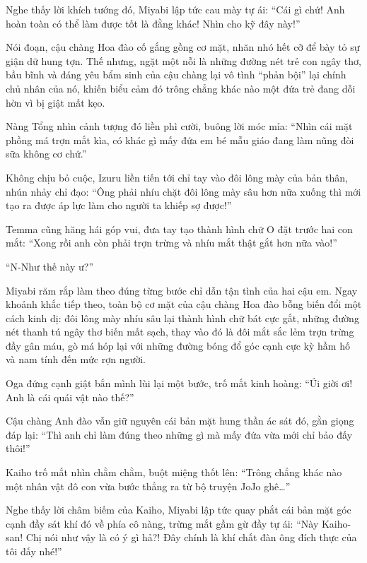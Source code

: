 \documentclass[../main.tex]{subfiles}
\begin{document}
Nghe thấy lời khích tướng đó, Miyabi lập tức cau mày tự ái: ``Cái gì chứ! Anh hoàn toàn có thể làm được tốt là đằng khác! Nhìn cho kỹ đây này!''

Nói đoạn, cậu chàng Hoa đào cố gắng gồng cơ mặt, nhăn nhó hết cỡ để bày tỏ sự giận dữ hung tợn. Thế nhưng, ngặt một nỗi là những đường nét trẻ con ngây thơ, bầu bĩnh và đáng yêu bẩm sinh của cậu chàng lại vô tình ``phản bội'' lại chính chủ nhân của nó, khiến biểu cảm đó trông chẳng khác nào một đứa trẻ đang dỗi hờn vì bị giật mất kẹo.


Nàng Tổng nhìn cảnh tượng đó liền phì cười, buông lời móc mỉa: ``Nhìn cái mặt phồng má trợn mắt kìa, có khác gì mấy đứa em bé mẫu giáo đang làm nũng đòi sữa không cơ chứ.''

Không chịu bỏ cuộc, Izuru liền tiến tới chỉ tay vào đôi lông mày của bản thân, nhún nhảy chỉ đạo: ``Ông phải nhíu chặt đôi lông mày sâu hơn nữa xuống thì mới tạo ra được áp lực làm cho người ta khiếp sợ được!''

Temma cũng hăng hái góp vui, đưa tay tạo thành hình chữ O đặt trước hai con mắt: ``Xong rồi anh còn phải trợn trừng và nhíu mắt thật gắt hơn nữa vào!''

``N-Như thế này ư?''

Miyabi răm rắp làm theo đúng từng bước chỉ dẫn tận tình của hai cậu em. Ngay khoảnh khắc tiếp theo, toàn bộ cơ mặt của cậu chàng Hoa đào bỗng biến đổi một cách kinh dị: đôi lông mày nhíu sâu lại thành hình chữ bát cực gắt, những đường nét thanh tú ngây thơ biến mất sạch, thay vào đó là đôi mắt sắc lẻm trợn trừng đầy gân máu, gò má hóp lại với những đường bóng đổ góc cạnh cực kỳ hầm hố và nam tính đến mức rợn người.


Oga đứng cạnh giật bắn mình lùi lại một bước, trố mắt kinh hoàng: ``Úi giời ơi! Anh là cái quái vật nào thế?''

Cậu chàng Anh đào vẫn giữ nguyên cái bản mặt hung thần ác sát đó, gằn giọng đáp lại: ``Thì anh chỉ làm đúng theo những gì mà mấy đứa vừa mới chỉ bảo đấy thôi!''

Kaiho trố mắt nhìn chằm chằm, buột miệng thốt lên: ``Trông chẳng khác nào một nhân vật đô con vừa bước thẳng ra từ bộ truyện JoJo ghê\dots''

Nghe thấy lời châm biếm của Kaiho, Miyabi lập tức quay phắt cái bản mặt góc cạnh đầy sát khí đó về phía cô nàng, trừng mắt gầm gừ đầy tự ái: ``Này Kaiho-san! Chị nói như vậy là có ý gì hả?! Đây chính là khí chất đàn ông đích thực của tôi đấy nhé!''
\end{document}
